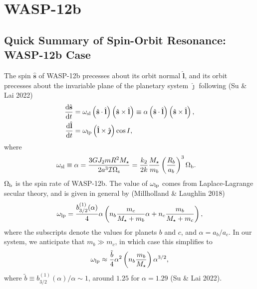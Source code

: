 \documentclass[12pt]{article}
\newcommand*{\rd}[2]{\frac{\mathrm{d}#1}{\mathrm{d}#2}}
\newcommand*{\bm}[1]{\boldsymbol{\mathbf{#1}}}
\newcommand*{\uv}[1]{\hat{\bm{#1}}}
\newcommand*{\p}[1]{\left(#1\right)}
\begin{document}
\clearpage

\section{WASP-12b}

\subsection{Quick Summary of Spin-Orbit Resonance: WASP-12b Case}

The spin $\uv{s}$ of WASP-12b precesses about its orbit normal $\uv{l}$, and its
orbit precesses about the invariable plane of the planetary system $\uv{\jmath}$
following (Su \& Lai 2022)
\begin{align}
    \rd{\uv{s}}{t}
        &= \omega_{\rm sl}\p{\uv{s} \cdot \uv{l}}\p{\uv{s} \times \uv{l}}
        \equiv \alpha\p{\uv{s} \cdot \uv{l}}\p{\uv{s} \times
        \uv{l}},\label{eq:dsdt1}\\
    \rd{\uv{l}}{t} &= \omega_{\rm lp}
        \p{\uv{l} \times \uv{\jmath}}\cos I,
        \label{eq:wasp12b_g}
\end{align}
where
\begin{align}
    \omega_{\rm sl} &\equiv \alpha =
        \frac{3GJ_2 mR^2 M_\star}{2a^3 \mathcal{I}\Omega_{\rm s}}
        = \frac{k_2}{2k}\frac{M_\star}{m_b}\p{\frac{R_b}{a_b}}^3 \Omega_{\rm b}
            \label{eq:wsl}.
\end{align}
$\Omega_{\rm b}$ is the spin rate of WASP-12b. The value of $\omega_{\rm lp}$
comes from Laplace-Lagrange secular theory, and is given in general by
(Millholland \& Laughlin 2018)
\begin{equation}
    \omega_{\rm lp}
        = \frac{b_{3/2}^{(1)}(\alpha)}{4}\alpha
            \p{n_b\frac{m_c}{M_\star + m_b}\alpha
                + n_c\frac{m_b}{M_\star + m_c}},
\end{equation}
where the subscripts denote the values for planets $b$ and $c$, and $\alpha =
a_b / a_c$. In our system, we anticipate that $m_b \gg m_c$, in which case this
simplifies to
\begin{equation}
    \omega_{\rm lp}
        \approx \frac{\tilde{b}}{4}\alpha^2
            \p{n_b\frac{m_b}{M_\star}}\alpha^{3/2},
\end{equation}
where $\tilde{b} \equiv b_{3/2}^{(1)}(\alpha) / \alpha \sim 1$, around $1.25$
for $\alpha = 1.29$ (Su \& Lai 2022).
\end{document}
